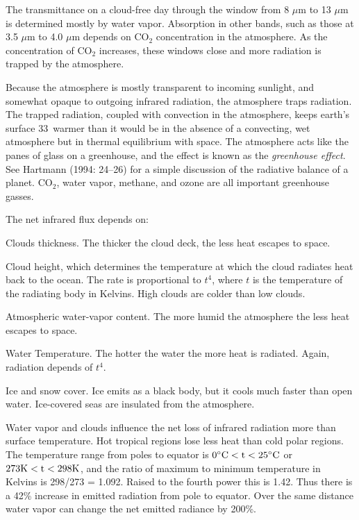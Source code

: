The transmittance on a cloud-free day through the window from 8 $\mu$m
to 13 $\mu$m is determined mostly by water vapor. Absorption in other
bands, such as those at 3.5 $\mu$m to 4.0 $\mu$m depends on CO$_2$
concentration in the atmosphere. As the concentration of CO$_2$
increases, these windows close and more radiation is trapped by the
atmosphere.

Because the atmosphere is mostly transparent to incoming sunlight, and
somewhat opaque to outgoing infrared radiation, the atmosphere traps
radiation. The trapped radiation, coupled with convection in the
atmosphere, keeps earth's surface 33\degrees\ warmer than it would be
in the absence of a convecting, wet atmosphere but in thermal
equilibrium with space. The atmosphere acts like the panes of glass on
a greenhouse, and the effect is known as the \textit{greenhouse
  effect}. See Hartmann (1994: 24--26)
for a simple discussion of the radiative balance of a planet. CO$_2$,
water vapor, methane, and ozone are all important greenhouse gasses.

The net infrared flux depends on:
\begin{enumerate}
\vitem Clouds thickness. The thicker the cloud deck, the less heat
escapes to space.

\vitem Cloud height, which determines the temperature at which the
cloud radiates heat back to the ocean. The rate is proportional to
$t^4$, where $t$ is the temperature of the radiating body in
Kelvins. High clouds are colder than low clouds.

\vitem Atmospheric water-vapor content. The more humid the atmosphere
the less heat escapes to space.

\vitem Water Temperature. The hotter the water the more heat is
radiated.  Again, radiation depends of $t^4$.

\vitem Ice and snow cover. Ice emits as a black body, but it cools
much faster than open water. Ice-covered seas are insulated from the
atmosphere.
\end{enumerate}

Water vapor and clouds influence the net loss of infrared radiation
more than surface temperature. Hot tropical regions lose less heat
than cold polar regions. The temperature range from poles to equator
is $0^{\circ}\rm{C} < t < 25^{\circ}\rm{C}$ or $273\rm{K} < t <
298\rm{K}$, and the ratio of maximum to minimum temperature in Kelvins
is 298/273 = 1.092. Raised to the fourth power this is 1.42. Thus
there is a 42\% increase in emitted radiation from pole to
equator. Over the same distance water vapor can change the net emitted
radiance by 200\%.

